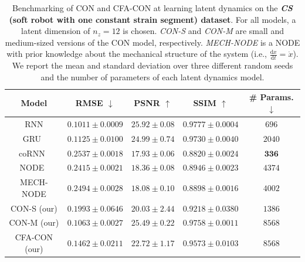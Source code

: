 \begin{table}[ht]
    \centering
    \begin{scriptsize}
    \begin{tabular}{c c c c c}
         \toprule
         \textbf{Model} & \textbf{RMSE} $\downarrow$ & \textbf{PSNR} $\uparrow$ & \textbf{SSIM} $\uparrow$ & \textbf{\# Params.} $\downarrow$ \\
         \midrule
         RNN & $\mathbf{0.1011 \pm 0.0009}$ & $\mathbf{25.92 \pm 0.08}$ & $\mathbf{0.9777 \pm 0.0004}$ & $696$\\
         GRU~\citep{cho2014learning} & $0.1125 \pm 0.0100$ & $24.99 \pm 0.74$ & $0.9730 \pm 0.0040$ & $2040$\\
         coRNN~\citep{rusch2020coupled} & $0.2537 \pm 0.0018$ & $17.93 \pm 0.06$ & $0.8820 \pm 0.0024$ & $\mathbf{336}$\\
         NODE~\citep{chen2018neural} & $0.2415 \pm 0.0021$ & $18.36 \pm 0.08$ & $0.8946 \pm 0.0023$ & $4374$\\
         MECH-NODE & $0.2494 \pm 0.0028$ & $18.08 \pm 0.10$ & $0.8898 \pm 0.0016$ & $4002$\\
         CON-S (our) & $0.1993 \pm 0.0646$ & $20.03 \pm 2.44$ & $0.9218 \pm 0.0380$ & $1386$\\
         CON-M (our) & $0.1063 \pm 0.0027$ & $25.49 \pm 0.22$ & $0.9758 \pm 0.0011$ & $8568$\\
         CFA-CON (our) & $0.1462 \pm 0.0211$ & $22.72 \pm 1.17$ & $0.9573 \pm 0.0103$ & $8568$\\
         \bottomrule
    \end{tabular}
    \end{scriptsize}
    \vspace{0.5cm}
    \caption{Benchmarking of \gls{CON} and \gls{CFA-CON} at learning latent dynamics on the \textbf{\emph{CS} (soft robot with one constant strain segment) dataset}. For all models, a latent dimension of $n_z=12$ is chosen. \emph{CON-S} and \emph{CON-M} are small and medium-sized versions of the \gls{CON} model, respectively. \emph{MECH-NODE} is a \gls{NODE} with prior knowledge about the mechanical structure of the system (i.e., $\frac{\mathrm{d}x}{\mathrm{d}t} = \dot{x}$). We report the mean and standard deviation over three different random seeds and the number of parameters of each latent dynamics model.
}
    \label{tab:apx-con:latent_dynamics_results:cs}
\end{table}

